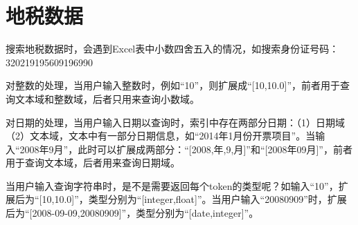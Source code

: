 \section{地税数据}
\par 搜索地税数据时，会遇到Excel表中小数四舍五入的情况，如搜索身份证号码：320219195609196990
\par 对整数的处理，当用户输入整数时，例如“10”，则扩展成“[10,10.0]”，前者用于查询文本域和整数域，后者只用来查询小数域。
\par 对日期的处理，当用户输入日期以查询时，索引中存在两部分日期：（1）日期域（2）文本域，文本中有一部分日期信息，如“2014年1月份开票项目”。当输入“2008年9月”，此时可以扩展成两部分：“[2008,年,9,月]”和“[2008年09月]”，前者用于查询文本域，后者用来查询日期域。
\par 当用户输入查询字符串时，是不是需要返回每个token的类型呢？如输入“10”，扩展后为“[10,10.0]”，类型分别为“[integer,float]”。当用户输入“20080909”时，扩展后为“[2008-09-09,20080909]”，类型分别为“[date,integer]”。
